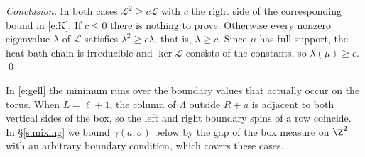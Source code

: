 \emph{Conclusion.} In both cases $\mathcal L^2 \ge c \mathcal L$ with $c$ the right side of the corresponding bound in \eqref{e:K}. If $c \le 0$ there is nothing to prove. Otherwise every nonzero eigenvalue $\lambda$ of $\mathcal L$ satisfies $\lambda^2 \ge c \lambda$, that is, $\lambda \ge c$. Since $\mu$ has full support, the heat-bath chain is irreducible and $\ker \mathcal L$ consists of the constants, so $\lambda(\mu) \ge c$. \qed

\begin{remark}\label{r:Kpins}
In \eqref{e:gell} the minimum runs over the boundary values that actually occur on the torus. When $L = \ell + 1$, the column of $\Lambda$ outside $R + a$ is adjacent to both vertical sides of the box, so the left and right boundary spins of a row coincide. In \S\ref{s:mixing} we bound $\gamma(a, \sigma)$ below by the gap of the box measure on $\Z^2$ with an arbitrary boundary condition, which covers these cases.
\end{remark}
